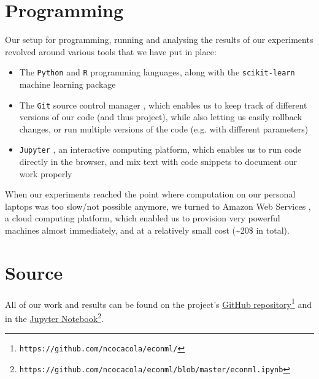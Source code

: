 \section{Programming}
Our setup for programming, running and analysing the results of our experiments revolved around various tools that we have put in place:
\begin{itemize}
    \item The \texttt{Python} and \texttt{R} programming languages, along with the \texttt{scikit-learn} machine learning package \cite{python}\cite{R}\cite{learn}
    \item The \texttt{Git} source control manager \cite{git}, which enables us to keep track of different versions of our code (and thus project), while also letting us easily rollback changes, or run multiple versions of the code (e.g. with different parameters)
    \item \texttt{Jupyter} \cite{jupyter}, an interactive computing platform, which enables us to run code directly in the browser, and mix text with code snippets to document our work properly
\end{itemize}

When our experiments reached the point where computation on our personal laptops was too slow/not possible anymore, we turned to Amazon Web Services \cite{aws}, a cloud computing platform, which enabled us to provision very powerful machines almost immediately, and at a relatively small cost (\textasciitilde20\$ in total).

\section{Source}
All of our work and results can be found on the project's \href{https://github.com/ncocacola/econml/}{GitHub repository}\footnote{\texttt{https://github.com/ncocacola/econml/}} and in the
\href{https://github.com/ncocacola/econml/blob/master/econml.ipynb}{Jupyter Notebook}\footnote{\texttt{https://github.com/ncocacola/econml/blob/master/econml.ipynb}}.

